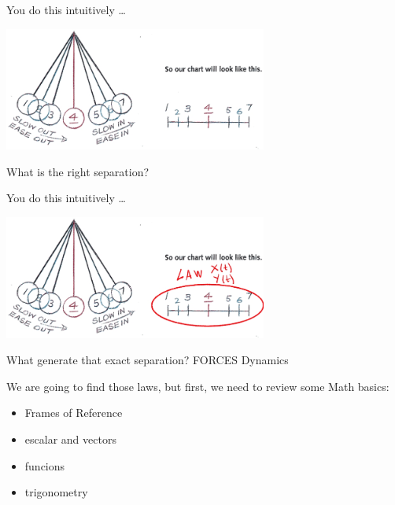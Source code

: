 \documentclass[]{beamer}
\begin{document}
  \begin{frame}
   
You do this intuitively \dots \pause

\begin{center}
   \includegraphics[height=1.6in]{images/space_timing.jpg}
 \end{center}
   

 \pause

 What is the right separation?
 \end{frame}

  

   \begin{frame}
   
      You do this intuitively \dots \pause
      
      \begin{center}
         \includegraphics[height=1.6in]{images/space_timing2.jpg}
       \end{center}
         
      
       \pause
      
       What generate that exact separation? \pause \textcolor{mypink1}{FORCES \pause Dynamics}
       \end{frame}
       
 

       
 

  \begin{frame}
   We are going to find those laws, but first, we need to review some Math basics: 
  
  \pause
  \vspace{3mm}
  
  \begin{itemize}
  \item Frames of Reference 
  \item escalar and vectors
  \item funcions
  \item trigonometry
  \end{itemize}
  
  
  
  
  
   \end{frame}
\end{document}
